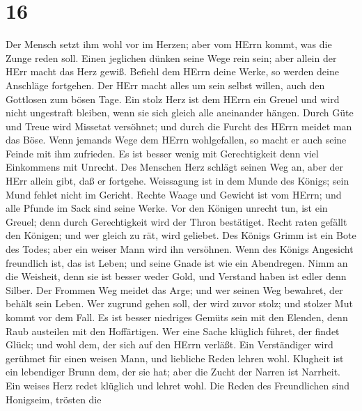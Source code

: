 \hypertarget{section-15}{%
\section{16}\label{section-15}}

 Der Mensch setzt ihm wohl vor im Herzen; aber vom HErrn
kommt, was die Zunge reden soll.  Einen jeglichen dünken
seine Wege rein sein; aber allein der HErr macht das Herz gewiß.
 Befiehl dem HErrn deine Werke, so werden deine Anschläge
fortgehen.  Der HErr macht alles um sein selbst willen, auch
den Gottlosen zum bösen Tage.  Ein stolz Herz ist dem HErrn
ein Greuel und wird nicht ungestraft bleiben, wenn sie sich gleich alle
aneinander hängen.  Durch Güte und Treue wird Missetat
versöhnet; und durch die Furcht des HErrn meidet man das Böse.
 Wenn jemands Wege dem HErrn wohlgefallen, so macht er auch
seine Feinde mit ihm zufrieden.  Es ist besser wenig mit
Gerechtigkeit denn viel Einkommens mit Unrecht.  Des
Menschen Herz schlägt seinen Weg an, aber der HErr allein gibt, daß er
fortgehe.  Weissagung ist in dem Munde des Königs; sein
Mund fehlet nicht im Gericht.  Rechte Waage und Gewicht ist
vom HErrn; und alle Pfunde im Sack sind seine Werke.  Vor
den Königen unrecht tun, ist ein Greuel; denn durch Gerechtigkeit wird
der Thron bestätiget.  Recht raten gefällt den Königen; und
wer gleich zu rät, wird geliebet.  Des Königs Grimm ist ein
Bote des Todes; aber ein weiser Mann wird ihn versöhnen. 
Wenn des Königs Angesicht freundlich ist, das ist Leben; und seine Gnade
ist wie ein Abendregen.  Nimm an die Weisheit, denn sie ist
besser weder Gold, und Verstand haben ist edler denn Silber.
 Der Frommen Weg meidet das Arge; und wer seinen Weg
bewahret, der behält sein Leben.  Wer zugrund gehen soll,
der wird zuvor stolz; und stolzer Mut kommt vor dem Fall. 
Es ist besser niedriges Gemüts sein mit den Elenden, denn Raub austeilen
mit den Hoffärtigen.  Wer eine Sache klüglich führet, der
findet Glück; und wohl dem, der sich auf den HErrn verläßt.
 Ein Verständiger wird gerühmet für einen weisen Mann, und
liebliche Reden lehren wohl.  Klugheit ist ein lebendiger
Brunn dem, der sie hat; aber die Zucht der Narren ist Narrheit.
 Ein weises Herz redet klüglich und lehret wohl.
 Die Reden des Freundlichen sind Honigseim, trösten die
